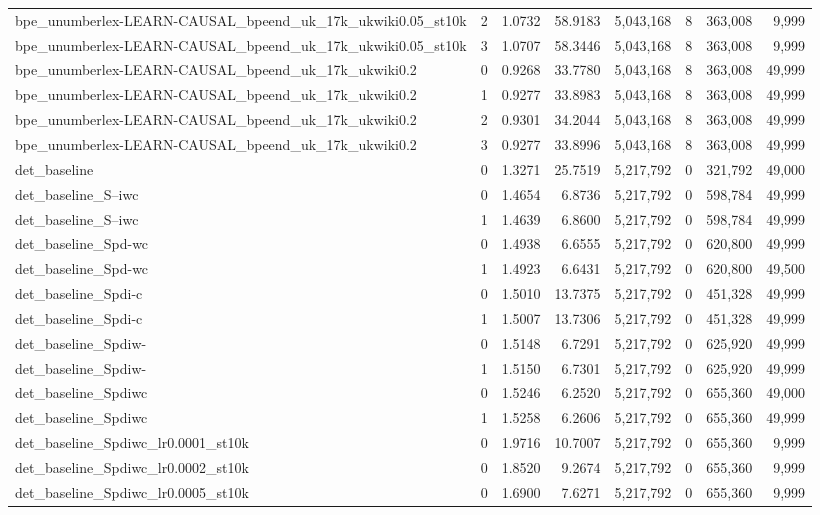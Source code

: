 \begin{tabular}{lrrrrrrr}
bpe\_unumberlex-LEARN-CAUSAL\_bpeend\_uk\_17k\_ukwiki0.05\_st10k & 2 & 1.0732 & 58.9183 & 5,043,168 & 8 & 363,008 & 9,999 \\
bpe\_unumberlex-LEARN-CAUSAL\_bpeend\_uk\_17k\_ukwiki0.05\_st10k & 3 & 1.0707 & 58.3446 & 5,043,168 & 8 & 363,008 & 9,999 \\
bpe\_unumberlex-LEARN-CAUSAL\_bpeend\_uk\_17k\_ukwiki0.2 & 0 & 0.9268 & 33.7780 & 5,043,168 & 8 & 363,008 & 49,999 \\
bpe\_unumberlex-LEARN-CAUSAL\_bpeend\_uk\_17k\_ukwiki0.2 & 1 & 0.9277 & 33.8983 & 5,043,168 & 8 & 363,008 & 49,999 \\
bpe\_unumberlex-LEARN-CAUSAL\_bpeend\_uk\_17k\_ukwiki0.2 & 2 & 0.9301 & 34.2044 & 5,043,168 & 8 & 363,008 & 49,999 \\
bpe\_unumberlex-LEARN-CAUSAL\_bpeend\_uk\_17k\_ukwiki0.2 & 3 & 0.9277 & 33.8996 & 5,043,168 & 8 & 363,008 & 49,999 \\
det\_baseline & 0 & 1.3271 & 25.7519 & 5,217,792 & 0 & 321,792 & 49,000 \\
det\_baseline\_S--iwc & 0 & 1.4654 & 6.8736 & 5,217,792 & 0 & 598,784 & 49,999 \\
det\_baseline\_S--iwc & 1 & 1.4639 & 6.8600 & 5,217,792 & 0 & 598,784 & 49,999 \\
det\_baseline\_Spd-wc & 0 & 1.4938 & 6.6555 & 5,217,792 & 0 & 620,800 & 49,999 \\
det\_baseline\_Spd-wc & 1 & 1.4923 & 6.6431 & 5,217,792 & 0 & 620,800 & 49,500 \\
det\_baseline\_Spdi-c & 0 & 1.5010 & 13.7375 & 5,217,792 & 0 & 451,328 & 49,999 \\
det\_baseline\_Spdi-c & 1 & 1.5007 & 13.7306 & 5,217,792 & 0 & 451,328 & 49,999 \\
det\_baseline\_Spdiw- & 0 & 1.5148 & 6.7291 & 5,217,792 & 0 & 625,920 & 49,999 \\
det\_baseline\_Spdiw- & 1 & 1.5150 & 6.7301 & 5,217,792 & 0 & 625,920 & 49,999 \\
det\_baseline\_Spdiwc & 0 & 1.5246 & 6.2520 & 5,217,792 & 0 & 655,360 & 49,000 \\
det\_baseline\_Spdiwc & 1 & 1.5258 & 6.2606 & 5,217,792 & 0 & 655,360 & 49,999 \\
det\_baseline\_Spdiwc\_lr0.0001\_st10k & 0 & 1.9716 & 10.7007 & 5,217,792 & 0 & 655,360 & 9,999 \\
det\_baseline\_Spdiwc\_lr0.0002\_st10k & 0 & 1.8520 & 9.2674 & 5,217,792 & 0 & 655,360 & 9,999 \\
det\_baseline\_Spdiwc\_lr0.0005\_st10k & 0 & 1.6900 & 7.6271 & 5,217,792 & 0 & 655,360 & 9,999 \\

\end{tabular}
